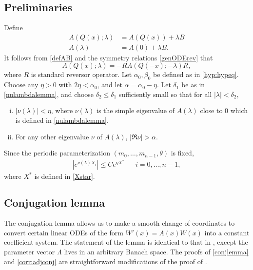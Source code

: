 \documentclass[10pt,reqno]{amsart}
\theoremstyle{plain}
\theoremstyle{definition}
\theoremstyle{remark}
\numberwithin{theorem}{section}
\numberwithin{equation}{section}
\begin{document}
\subsection{Preliminaries}

Define
\begin{equation}
\begin{aligned}
A(Q(x); \lambda) &= A(Q(x)) + \lambda B \\
A(\lambda) &= A(0) + \lambda B.
\end{aligned}
\end{equation}
It follows from \cref{defAB} and the symmetry relations \cref{genODErev} that 
\begin{equation}\label{AQsymmetry}
A(Q(x); \lambda) = -R A(Q(-x); -\lambda)R,
\end{equation}
where $R$ is standard reversor operator. Let $\alpha_0, \beta_0$ be defined as in \cref{hyp:hypeq}. Choose any $\eta > 0$ with $2 \eta < \alpha_0$, and let $\alpha = \alpha_0 - \eta$. Let $\delta_1$ be as in \cref{nulambdalemma}, and choose $\delta_2 \leq \delta_1$ sufficiently small so that for all $|\lambda| < \delta_2$,
\begin{enumerate}[(i)]
\item $|\nu(\lambda)| < \eta$, where $\nu(\lambda)$ is the simple eigenvalue of $A(\lambda)$ close to 0 which is defined in \cref{nulambdalemma}.
\item For any other eigenvalue $\nu$ of $A(\lambda)$, $|\Re \nu| > \alpha$.
\end{enumerate} 
Since the periodic parameterization $(m_0, \dots, m_{n-1}, \theta)$ is fixed, 
\begin{align}\label{nubound}
|e^{\nu(\lambda)X_i}| \leq C e^{\eta X^*} && i = 0, \dots, n-1,
\end{align}
where $X^*$ is defined in \cref{Xstar}. 

\subsection{Conjugation lemma}

The conjugation lemma allows us to make a smooth change of coordinates to convert certain linear ODEs of the form $W'(x) = A(x) W(x)$ into a constant coefficient system. The statement of the lemma is identical to that in \cite{Zumbrun2009}, except the parameter vector $\Lambda$ lives in an arbitrary Banach space. The proofs of \cref{conjlemma} and \cref{corr:adjconj} are straightforward modifications of the proof of \cite[Corollary 2.3]{Zumbrun2009}.
\end{document}
